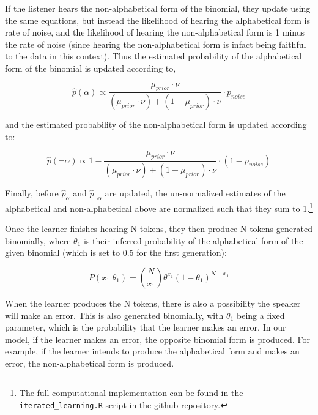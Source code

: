 \documentclass[
  jou,floatsintext]{apa6}
\begin{document}
If the listener hears the non-alphabetical form of the binomial, they update using the same equations, but instead the likelihood of hearing the alphabetical form is rate of noise, and the likelihood of hearing the non-alphabetical form is 1 minus the rate of noise (since hearing the non-alphabetical form is infact being faithful to the data in this context). Thus the estimated probability of the alphabetical form of the binomial is updated according to,

\begin{equation}
\label{eq:phatAlpha2}
\hat{p}(\alpha) \propto \frac{\mu_{prior} \cdot \nu}{(\mu_{prior} \cdot \nu) + (1 - \mu_{prior}) \cdot \nu} \cdot p_{noise} 
\end{equation}

and the estimated probability of the non-alphabetical form is updated according to:

\begin{equation}
\label{eq:phatNonalpha2}
\hat{p}(\neg\alpha) \propto 1 - \frac{\mu_{prior} \cdot \nu}{(\mu_{prior} \cdot \nu) + (1 - \mu_{prior}) \cdot \nu} \cdot (1-p_{noise}) 
\end{equation}

Finally, before \(\hat{p}_\alpha\) and \(\hat{p}_{\neg\alpha}\) are updated, the un-normalized estimates of the alphabetical and non-alphabetical above are normalized such that they sum to 1.\footnote{The full computational implementation can be found in the \texttt{iterated\_learning.R} script in the github repository.}

Once the learner finishes hearing N tokens, they then produce N tokens generated binomially, where \(\theta_1\) is their inferred probability of the alphabetical form of the given binomial (which is set to 0.5 for the first generation):

\begin{equation}
\label{eq:binomialProd}
P(x_1|\theta_1) = \binom{N}{x_1} \theta^{x_1} (1-\theta_1)^{N-x_1}
\end{equation}

When the learner produces the N tokens, there is also a possibility the speaker will make an error. This is also generated binomially, with \(\theta_1\) being a fixed parameter, which is the probability that the learner makes an error. In our model, if the learner makes an error, the opposite binomial form is produced. For example, if the learner intends to produce the alphabetical form and makes an error, the non-alphabetical form is produced.
\end{document}
